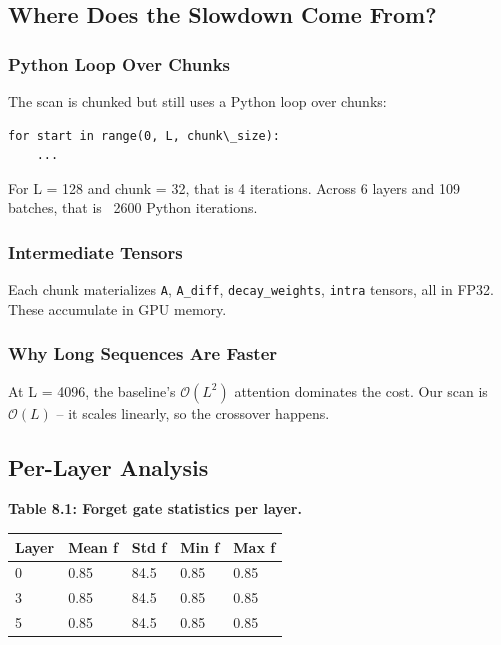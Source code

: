 \subsection{Where Does the Slowdown Come From?}

\subsubsection{Python Loop Over Chunks}

The scan is chunked but still uses a Python loop over chunks:

\begin{lstlisting}
for start in range(0, L, chunk\_size):
    ...
\end{lstlisting}

For L = 128 and chunk = 32, that is 4 iterations. Across 6 layers and 109 
batches, that is ~2600 Python iterations.

\subsubsection{Intermediate Tensors}

Each chunk materializes \texttt{A}, \texttt{A\_diff}, \texttt{decay\_weights}, \texttt{intra} tensors, all 
in FP32. These accumulate in GPU memory.

\subsubsection{Why Long Sequences Are Faster}

At L = 4096, the baseline's $\mathcal{O}(L^2)$ attention dominates the cost. 
Our scan is $\mathcal{O}(L)$ -- it scales linearly, so the crossover happens.

\subsection{Per-Layer Analysis}

\textbf{Table 8.1: Forget gate statistics per layer.}

\begin{table}[H]
\centering
\small
\begin{tabular}{lllll}
\toprule
\textbf{Layer} & \textbf{Mean f} & \textbf{Std f} & \textbf{Min f} & \textbf{Max f} \\
\midrule
0 & 0.85 & 84.5 & 0.85 & 0.85 \\
3 & 0.85 & 84.5 & 0.85 & 0.85 \\
5 & 0.85 & 84.5 & 0.85 & 0.85 \\
\bottomrule
\end{tabular}
\end{table}

